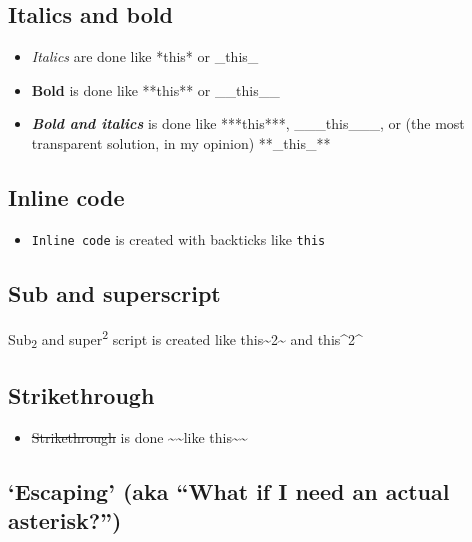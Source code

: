 \documentclass[a4paper,nobind]{templates/ociamthesis}
\providecommand{\tightlist}{%
  \setlength{\itemsep}{0pt}\setlength{\parskip}{0pt}}
\begin{document}
\subsection{Italics and bold}\label{italics-and-bold}

\begin{itemize}
\tightlist
\item
  \emph{Italics} are done like *this* or \_this\_
\item
  \textbf{Bold} is done like **this** or \_\_this\_\_
\item
  \textbf{\emph{Bold and italics}} is done like ***this***,
  \_\_\_this\_\_\_, or (the most transparent solution, in my opinion)
  **\_this\_**
\end{itemize}

\subsection{Inline code}\label{inline-code}

\begin{itemize}
\tightlist
\item
  \texttt{Inline\ code} is created with backticks like
  \texttt{\textasciigrave{}this\textasciigrave{}}
\end{itemize}

\subsection{Sub and superscript}\label{sub-and-superscript}

Sub\textsubscript{2} and super\textsuperscript{2} script is created like
this\textasciitilde{}2\textasciitilde{} and this\^{}2\^{}

\subsection{Strikethrough}\label{strikethrough}

\begin{itemize}
\tightlist
\item
  \sout{Strikethrough} is done \textasciitilde{}\textasciitilde{}like
  this\textasciitilde{}\textasciitilde{}
\end{itemize}

\subsection{\texorpdfstring{`Escaping' (aka ``What if I need an actual
asterisk?'')}{Escaping (aka What if I need an actual asterisk?)}}\label{escaping-aka-what-if-i-need-an-actual-asterisk}
\end{document}

